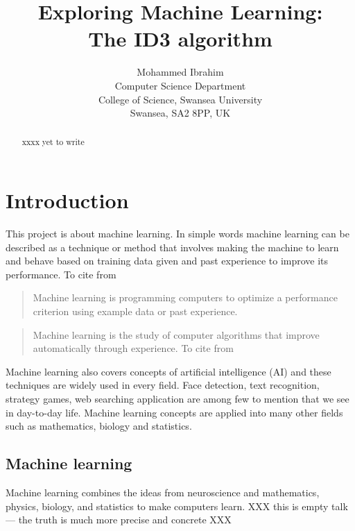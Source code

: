 \documentclass{article}
\begin{document}
\title{Exploring Machine Learning:\\
  The ID3 algorithm}

\author{Mohammed Ibrahim\\
 Computer Science Department\\
  College of Science, Swansea University\\
  Swansea, SA2 8PP, UK
}

\maketitle
\begin{abstract}
xxxx yet to write
\end{abstract}
\pagebreak
\tableofcontents
\pagebreak
\section{Introduction}
\label{sec:int}

This project is about machine learning. In simple words machine learning can be described as a technique or method that involves making the machine to learn and behave based on training data given and past experience to improve its performance. To cite from \cite{Alpaydin2010MachineLearning}
\begin{quote}
  Machine learning is programming computers to optimize a performance
  criterion using example data or past experience.
\end{quote}

\begin{quote}
  Machine learning is the study of computer algorithms that improve automatically through experience. To cite from \cite{Mitchell1997MachineLearning} 
\end{quote}

Machine learning also covers concepts of artificial intelligence (AI) and these techniques are widely used in every field. Face detection, text recognition, strategy games, web searching application are among few to mention that we see in day-to-day life. Machine learning concepts are applied into many other fields such as mathematics, biology and statistics.



\subsection{Machine learning}
\label{sec:machinelearn}

Machine learning combines the ideas from neuroscience and mathematics, physics, biology, and statistics to make computers learn. XXX this is empty talk --- the truth is much more precise and concrete XXX
\end{document}

